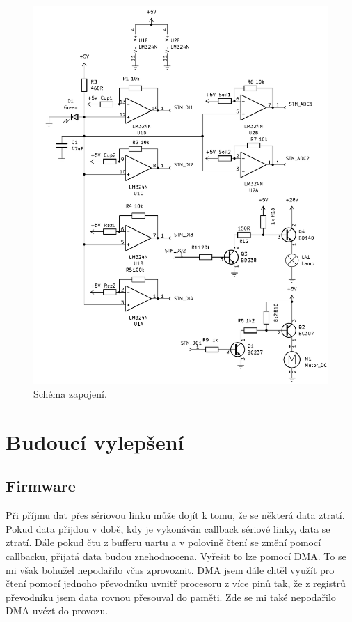 \documentclass[11pt,a4paper]{article}
\begin{document}
	\newpage
	
	\begin{figure}[h!]
		\centering
		\includegraphics[width=1\linewidth]{schema_pocket.png}
		\caption{Schéma zapojení.}
		\label{fig:schemapocket}
	\end{figure}

	\section{Budoucí vylepšení}
	\subsection{Firmware}
	Při příjmu dat přes sériovou linku může dojít k tomu, že se některá data ztratí. Pokud data přijdou v době, kdy je vykonáván callback sériové linky, data se ztratí. Dále pokud čtu z bufferu uartu a v polovině čtení se změní pomocí callbacku, přijatá data budou znehodnocena. Vyřešit to lze pomocí DMA. To se mi však bohužel nepodařilo včas zprovoznit. DMA jsem dále chtěl využít pro čtení pomocí jednoho převodníku uvnitř procesoru z více pinů tak, že z registrů převodníku jsem data rovnou přesouval do paměti. Zde se mi také nepodařilo DMA uvézt do provozu.
	
\end{document}

